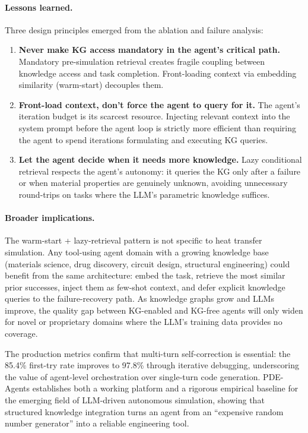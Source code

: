 \documentclass[preprint,review,12pt]{elsarticle}
\newif\ifrevisionsvisible
\newcommand{\revised}[1]{%
  \ifrevisionsvisible\textcolor{revisionred}{#1}\else#1\fi}
\begin{document}
\paragraph{Lessons learned.}
Three design principles emerged from the ablation and failure analysis:
\begin{enumerate}
  \item \textbf{Never make KG access mandatory in the agent's critical path.}
        Mandatory pre-simulation retrieval creates fragile coupling between
        knowledge access and task completion.  Front-loading context via
        embedding similarity (warm-start) decouples them.
  \item \textbf{Front-load context, don't force the agent to query for it.}
        The agent's iteration budget is its scarcest resource.  Injecting
        relevant context into the system prompt before the agent loop is
        strictly more efficient than requiring the agent to spend iterations
        formulating and executing KG queries.
  \item \textbf{Let the agent decide when it needs more knowledge.}
        Lazy conditional retrieval respects the agent's autonomy: it queries
        the KG only after a failure or when material properties are genuinely
        unknown, avoiding unnecessary round-trips on tasks where the LLM's
        parametric knowledge suffices.
\end{enumerate}

\paragraph{Broader implications.}
The warm-start + lazy-retrieval pattern is not specific to heat transfer
simulation.  Any tool-using agent domain with a growing knowledge base
(materials science, drug discovery, circuit design, structural
engineering) could benefit from the same architecture: embed the task,
retrieve the most similar prior successes, inject them as few-shot
context, and defer explicit knowledge queries to the failure-recovery
path.  As knowledge graphs grow and LLMs improve, the quality gap
between KG-enabled and KG-free agents will only widen for novel or
proprietary domains where the LLM's training data provides no coverage.

The production metrics confirm that multi-turn self-correction is
essential: the \revised{85.4\%} first-try rate improves to 97.8\% through
iterative debugging, underscoring the value of agent-level orchestration
over single-turn code generation.  PDE-Agents establishes both a working
platform and a rigorous empirical baseline for the emerging field of
LLM-driven autonomous simulation, showing that structured knowledge
integration turns an agent from an ``expensive random number
generator'' into a reliable engineering tool.
\end{document}
